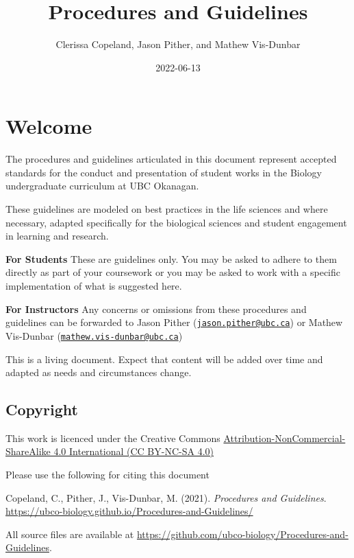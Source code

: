 \documentclass[
]{book}
\title{Procedures and Guidelines}
\author{Clerissa Copeland, Jason Pither, and Mathew Vis-Dunbar}
\date{2022-06-13}
\begin{document}
\maketitle

{
\setcounter{tocdepth}{1}
\tableofcontents
}
\hypertarget{welcome}{%
\chapter*{Welcome}\label{welcome}}

The procedures and guidelines articulated in this document represent accepted standards for the conduct and presentation of student works in the Biology undergraduate curriculum at UBC Okanagan.

These guidelines are modeled on best practices in the life sciences and where necessary, adapted specifically for the biological sciences and student engagement in learning and research.

\textbf{For Students} These are guidelines only. You may be asked to adhere to them directly as part of your coursework or you may be asked to work with a specific implementation of what is suggested here.

\textbf{For Instructors} Any concerns or omissions from these procedures and guidelines can be forwarded to Jason Pither (\href{mailto:jason.pither@ubc.ca}{\nolinkurl{jason.pither@ubc.ca}}) or Mathew Vis-Dunbar (\href{mailto:mathew.vis-dunbar@ubc.ca}{\nolinkurl{mathew.vis-dunbar@ubc.ca}})

This is a living document. Expect that content will be added over time and adapted as needs and circumstances change.

\hypertarget{copyright}{%
\section*{Copyright}\label{copyright}}

This work is licenced under the Creative Commons \href{https://creativecommons.org/licenses/by-nc-sa/4.0/}{Attribution-NonCommercial-ShareAlike 4.0 International (CC BY-NC-SA 4.0)}

Please use the following for citing this document

Copeland, C., Pither, J., Vis-Dunbar, M. (2021). \emph{Procedures and Guidelines}. \url{https://ubco-biology.github.io/Procedures-and-Guidelines/}

All source files are available at \url{https://github.com/ubco-biology/Procedures-and-Guidelines}.
\end{document}
